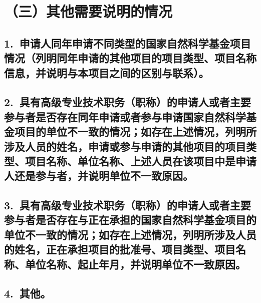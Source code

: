 \documentclass[12pt,UTF8,AutoFakeBold=3,a4paper]{ctexart} %
\begin{document}
{}


\section{{\bfseries （三）其他需要说明的情况}} %

\subsection{\hspace{1.45em} 1.~申请人同年申请不同类型的国家自然科学基金项目情况（列明同年申请的其他项目的项目类型、项目名称信息，并说明与本项目之间的区别与联系）。}


{}

\subsection{\hspace{1.45em} 2.~具有高级专业技术职务（职称）的申请人或者主要参与者是否存在同年申请或者参与申请国家自然科学基金项目的单位不一致的情况；如存在上述情况，列明所涉及人员的姓名，申请或参与申请的其他项目的项目类型、项目名称、单位名称、上述人员在该项目中是申请人还是参与者，并说明单位不一致原因。} %

{}

\subsection{\hspace{1.45em} 3.~具有高级专业技术职务（职称）的申请人或者主要参与者是否存在与正在承担的国家自然科学基金项目的单位不一致的情况；如存在上述情况，列明所涉及人员的姓名，正在承担项目的批准号、项目类型、项目名称、单位名称、起止年月，并说明单位不一致原因。} %

{}

\subsection{\hspace{1.45em} 4.~其他。}

{}

\clearpage
\end{document}
